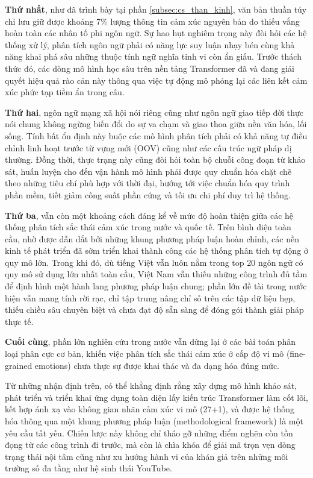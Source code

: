 \textbf{Thứ nhất}, như đã trình bày tại phần \ref{subsec:cs_than_kinh}, văn bản thuần túy chỉ lưu giữ được khoảng 7\% lượng thông tin cảm xúc nguyên bản do thiếu vắng hoàn toàn các nhân tố phi ngôn ngữ. Sự hao hụt nghiêm trọng này đòi hỏi các hệ thống xử lý, phân tích ngôn ngữ phải có năng lực suy luận nhạy bén cùng khả năng khai phá sâu những thuộc tính ngữ nghĩa tinh vi còn ẩn giấu. Trước thách thức đó, các dòng mô hình học sâu trên nền tảng Transformer đã và đang giải quyết hiệu quả rào cản này thông qua việc tự động mô phỏng lại các liên kết cảm xúc phức tạp tiềm ẩn trong câu.

\textbf{Thứ hai}, ngôn ngữ mạng xã hội nói riêng cũng như ngôn ngữ giao tiếp đời thực nói chung không ngừng biến đổi do sự va chạm và giao thoa giữa nền văn hóa, lối sống. Tính bất ổn định này buộc các mô hình phân tích phải có khả năng tự điều chỉnh linh hoạt trước từ vựng mới (OOV) cũng như các cấu trúc ngữ pháp dị thường. Đồng thời, thực trạng này cũng đòi hỏi toàn bộ chuỗi công đoạn từ khảo sát, huấn luyện cho đến vận hành mô hình phải được quy chuẩn hóa chặt chẽ theo những tiêu chí phù hợp với thời đại, hướng tới việc chuẩn hóa quy trình phần mềm, tiết giảm công suất phần cứng và tối ưu chi phí duy trì hệ thống.

\textbf{Thứ ba}, vẫn còn một khoảng cách đáng kể về mức độ hoàn thiện giữa các hệ thống phân tích sắc thái cảm xúc trong nước và quốc tế. Trên bình diện toàn cầu, nhờ được dẫn dắt bởi những khung phương pháp luận hoàn chỉnh, các nền kinh tế phát triển đã sớm triển khai thành công các hệ thống phân tích tự động ở quy mô lớn. Trong khi đó, dù tiếng Việt vẫn luôn nằm trong top 20 ngôn ngữ có quy mô sử dụng lớn nhất toàn cầu, Việt Nam vẫn thiếu những công trình đủ tầm để định hình một hành lang phương pháp luận chung; phần lớn đề tài trong nước hiện vẫn mang tính rời rạc, chỉ tập trung nâng chỉ số trên các tập dữ liệu hẹp, thiếu chiều sâu chuyên biệt và chưa đạt độ sẵn sàng để đóng gói thành giải pháp thực tế.

\textbf{Cuối cùng}, phần lớn nghiên cứu trong nước vẫn dừng lại ở các bài toán phân loại phân cực cơ bản, khiến việc phân tích sắc thái cảm xúc ở cấp độ vi mô (fine-grained emotions) chưa thực sự được khai thác và đa dạng hóa đúng mức.

Từ những nhận định trên, có thể khẳng định rằng xây dựng mô hình khảo sát, phát triển và triển khai ứng dụng toàn diện lấy kiến trúc Transformer làm cốt lõi, kết hợp ánh xạ vào không gian nhãn cảm xúc vi mô (27+1), và được hệ thống hóa thông qua một khung phương pháp luận (methodological framework) là một yêu cầu tất yếu. Chiến lược này không chỉ tháo gỡ những điểm nghẽn còn tồn đọng từ các công trình đi trước, mà còn là chìa khóa để giải mã trọn vẹn dòng trạng thái nội tâm cũng như xu hướng hành vi của khán giả trên những môi trường số đa tầng như hệ sinh thái YouTube.
